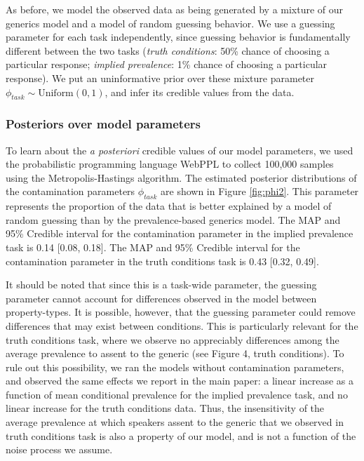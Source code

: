 \documentclass[10pt,letterpaper]{article}
\begin{document}
As before, we model the observed data as being generated by a mixture of our generics model and a model of random guessing behavior. 
We use a guessing parameter for each task independently, since guessing behavior is fundamentally different between the two tasks (\emph{truth conditions}: 50\% chance of choosing a particular response; \emph{implied prevalence}: 1\% chance of choosing a particular response).
We put an uninformative prior over these mixture parameter $\phi_{task} \sim \text{Uniform}(0,1)$, and infer its credible values from the data.

\subsubsection{Posteriors over model parameters}

To learn about the \emph{a posteriori} credible values of our model parameters, we used the probabilistic programming language WebPPL \cite{dippl} to collect 100,000 samples using the Metropolis-Hastings algorithm. 
The estimated posterior distributions of the contamination parameters $\phi_{task}$ are shown in Figure \ref{fig:phi2}. 
This parameter represents the proportion of the data that is better explained by a model of random guessing than by the prevalence-based generics model. 
The MAP and 95\% Credible interval for the contamination parameter in the implied prevalence task is 0.14 [0.08, 0.18]. 
The MAP and 95\% Credible interval for the contamination parameter in the truth conditions task is 0.43 [0.32, 0.49]. 

It should be noted that since this is a task-wide parameter, the guessing parameter cannot account for differences observed in the model between property-types.
It is possible, however, that the guessing parameter could remove differences that may exist between conditions. 
This is particularly relevant for the truth conditions task, where we observe no appreciably differences among the average prevalence to assent to the generic (see Figure 4, truth conditions). To rule out this possibility, we ran the models without contamination parameters, and observed the same effects we report in the main paper: a linear increase as a function of mean conditional prevalence for the implied prevalence task, and no linear increase for the truth conditions data. 
Thus, the insensitivity of the average prevalence at which speakers assent to the generic that we observed in truth conditions task is also a property of our model, and is not a function of the noise process we assume.
\end{document}
